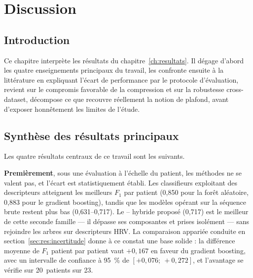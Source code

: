 \chapter{Discussion}
\label{ch:discussion}

\section{Introduction}
\label{sec:disc:intro}
Ce chapitre interprète les résultats du chapitre~\ref{ch:resultats}. Il dégage d'abord les quatre enseignements principaux du travail, les confronte ensuite à la littérature en expliquant l'écart de performance par le protocole d'évaluation, revient sur le compromis favorable de la compression et sur la robustesse cross-dataset, décompose ce que recouvre réellement la notion de plafond, avant d'exposer honnêtement les limites de l'étude.

\section{Synthèse des résultats principaux}
\label{sec:disc:synthese}

Les quatre résultats centraux de ce travail sont les suivants.

\textbf{Premièrement}, sous une évaluation à l'échelle du patient, les méthodes ne se valent pas, et l'écart est statistiquement établi. Les classifieurs exploitant des descripteurs  atteignent les meilleurs \(F_1\) par patient (0,850 pour la forêt aléatoire, 0,883 pour le gradient boosting), tandis que les modèles opérant sur la séquence \RR{} brute restent plus bas (0,631--0,717). Le \CNN--\LSTM{} hybride proposé (0,717) est le meilleur de cette seconde famille — il dépasse ses composantes \CNN{} et \LSTM{} prises isolément — sans rejoindre les arbres sur descripteurs HRV. La comparaison appariée conduite en section~\ref{sec:res:incertitude} donne à ce constat une base solide : la différence moyenne de \(F_1\) patient par patient vaut \(+0{,}167\) en faveur du gradient boosting, avec un intervalle de confiance à 95~\% de \([+0{,}076 ;\ +0{,}272]\), et l'avantage se vérifie sur 20~patients sur 23.

